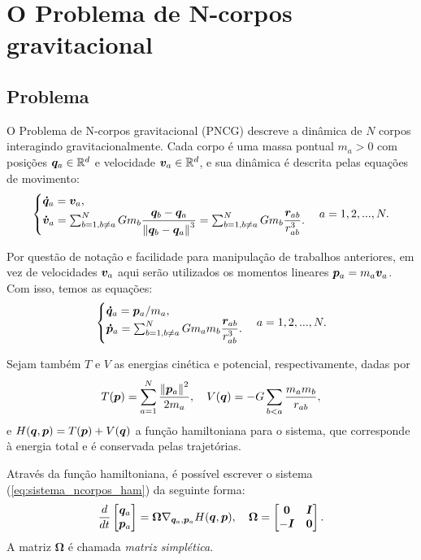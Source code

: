 \section{O Problema de N-corpos gravitacional}

\subsection{Problema}
O Problema de N-corpos gravitacional (PNCG) descreve a dinâmica de $N$ corpos interagindo gravitacionalmente. Cada corpo é uma massa pontual $m_a > 0$ com posições $\bm q_a \in \mathbb{R}^d$ e velocidade $\bm v_a \in \mathbb{R}^d$, e sua dinâmica é descrita pelas equações de movimento:
\begin{equation}
  \begin{cases}
    \bm {\dot q}_a = \bm v_a, \\
    \bm {\dot v}_a = \sum_{b = 1, b \neq a}^{N} G m_b \dfrac{\bm q_b - \bm q_a}{\left\Vert \bm q_b - \bm q_a \right\Vert^3} = \sum_{b=1, b \neq a}^{N} G m_b \dfrac{\bm r_{ab}}{r_{ab}^3}.
  \end{cases}
  a = 1, 2, ..., N.
\end{equation}

Por questão de notação e facilidade para manipulação de trabalhos anteriores, em vez de velocidades $\bm v_a$ aqui serão utilizados os momentos lineares $\bm p_a = m_a \bm v_a$. Com isso, temos as equações:
\begin{equation}\label{eq:sistema_ncorpos_ham}
  \begin{cases}
    \bm {\dot q}_a = \bm p_a / m_a, \\
    \bm {\dot p}_a = \sum_{b=1, b \neq a}^{N} G m_a m_b \dfrac{\bm r_{ab}}{r_{ab}^3}.
  \end{cases}
  a = 1, 2, ..., N.
\end{equation}

Sejam também $T$ e $V$ as energias cinética e potencial, respectivamente, dadas por
\begin{equation}
  T(\bm p) = \sum_{a=1}^N \dfrac{\left\Vert \bm p_a \right\Vert^2}{2 m_a},
  \quad
  V(\bm q) = - G \sum_{b < a} \dfrac{m_a m_b}{r_{ab}},
\end{equation}
e $H(\bm q, \bm p) = T(\bm p) + V(\bm q)$ a função hamiltoniana para o sistema, que corresponde à energia total e é conservada pelas trajetórias.

Através da função hamiltoniana, é possível escrever o sistema (\ref{eq:sistema_ncorpos_ham}) da seguinte forma:
\begin{equation}
\dfrac{d }{d t} \begin{bmatrix} \bm q_a \\ \bm p_a \end{bmatrix} = \bm \Omega \nabla_{\bm q_a, \bm p_a} H(\bm q, \bm p),
\quad
\bm \Omega = \begin{bmatrix}\bm 0 & \bm I \\ -\bm I & \bm 0\end{bmatrix}.
\end{equation}
A matriz $\bm \Omega$ é chamada \textit{matriz simplética}.

